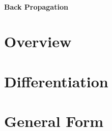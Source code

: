 \begin{flushleft}
            \subsubsection{Back Propagation}
                \chapter{Overview}
                \chapter{Differentiation}
                \chapter{General Form}

\end{flushleft}